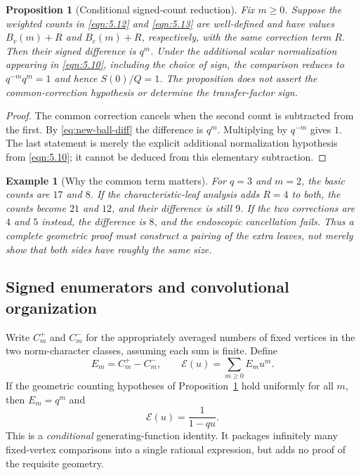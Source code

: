 \documentclass[12pt,letterpaper]{amsart}
\numberwithin{equation}{section}
\newtheorem{proposition}[theorem]{Proposition}
\newtheorem{example}[theorem]{Example}
\theoremstyle{definition}
\theoremstyle{plain}
\begin{document}
\begin{proposition}[Conditional signed-count reduction]
\label{prop:new-conditional}
Fix $m\geq0$. Suppose the weighted counts in
\eqref{eqn:5.12} and \eqref{eqn:5.13} are well-defined and have
values $B_v(m)+R$ and $B_e(m)+R$, respectively, with the
\emph{same} correction term $R$. Then their signed difference is
$q^m$. Under the additional scalar normalization appearing in
\eqref{eqn:5.10}, including the choice of sign, the comparison
reduces to $q^{-m}q^m=1$ and hence $S(0)/Q=1$.
The proposition does not assert the common-correction hypothesis
or determine the transfer-factor sign.
\end{proposition}
\begin{proof}
The common correction cancels when the second count is
subtracted from the first. By \eqref{eq:new-ball-diff} the
difference is $q^m$. Multiplying by $q^{-m}$ gives $1$.
The last statement is merely the explicit additional
normalization hypothesis from \eqref{eqn:5.10}; it cannot be
deduced from this elementary subtraction.
\end{proof}

\begin{example}[Why the common term matters]
For $q=3$ and $m=2$, the basic counts are $17$ and $8$.
If the characteristic-leaf analysis adds $R=4$ to both, the
counts become $21$ and $12$, and their difference is still $9$.
If the two corrections are $4$ and $5$ instead, the difference
is $8$, and the endoscopic cancellation fails. Thus a complete
geometric proof must construct a pairing of the extra leaves,
not merely show that both sides have roughly the same size.
\end{example}

\subsection{Signed enumerators and convolutional organization}
Write $C_m^+$ and $C_m^-$ for the appropriately averaged
numbers of fixed vertices in the two norm-character classes,
assuming each sum is finite. Define
\[
 E_m=C_m^+-C_m^-,\qquad
 \mathcal E(u)=\sum_{m\geq0}E_m u^m.
\]
If the geometric counting hypotheses of
Proposition~\ref{prop:new-conditional} hold uniformly for all
$m$, then $E_m=q^m$ and
\begin{equation}\label{eq:new-Egen}
 \mathcal E(u)=\frac1{1-qu}.
\end{equation}
This is a \emph{conditional} generating-function identity.
It packages infinitely many fixed-vertex comparisons into a single
rational expression, but adds no proof of the requisite geometry.
\end{document}
